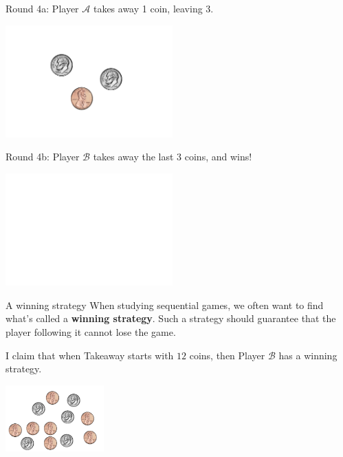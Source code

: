 \documentclass{beamer}
\theoremstyle{theorem}
\theoremstyle{definition}
\newcommand{\<}{\langle}
\renewcommand{\>}{\rangle}
\newcommand{\pl}[1]{\mathscr{#1}}
\newcommand{\vpause}{\pause\vspace{1em}}
\newcommand{\term}[1]{\textbf{#1}}
\begin{document}
\begin{frame}
  Round 4a: Player $\pl A$ takes away 1 coin, leaving 3.

  \centerline{
    \includegraphics[height=1.7in]{takeawayCoins/03.pdf}
  }
\end{frame}

\begin{frame}
  Round 4b: Player $\pl B$ takes away the last 3 coins, and wins!

  \centerline{
    \includegraphics[height=1.7in]{takeawayCoins/00.pdf}
  }
\end{frame}

\begin{frame}{A winning strategy}
  When studying sequential games, we often want to find what's called
  a \term{winning strategy}. Such a strategy should guarantee that the player
  following it cannot lose the game.

  \vpause

  I claim that when Takeaway starts with $12$ coins, then Player $\pl B$ has
  a winning strategy.

  \centerline{
    \includegraphics[height=1in]{takeawayCoins/12.pdf}
  }
\end{frame}
\end{document}
